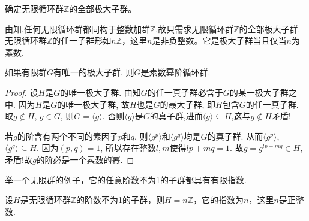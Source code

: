 \documentclass[../../main.tex]{subfiles}%
\begin{document}
\begin{example}
确定无限循环群$\mathbb{Z}$的全部极大子群。
\end{example}
\begin{solution}

由知,任何无限循环群都同构于整数加群$\mathbb{Z}$,故只需求无限循环群$\mathbb{Z}$的全部极大子群.无限循环群$\mathbb{Z}$的任一子群形如$n\mathbb{Z}$，这里$n$是非负整数。它是极大子群当且仅当$n$为素数.

\end{solution}

\begin{proposition}\label{proposition:有限群唯一极大子群则必为素数幂阶循环群}
如果有限群$G$有唯一的极大子群, 则$G$是素数幂阶循环群.
\end{proposition}
\begin{proof}

设$H$是$G$的唯一极大子群. 由知$G$的任一真子群必含于$G$的某一极大子群之中. 因为$H$是$G$的唯一极大子群, 故$H$也是$G$的最大子群, 即$H$包含$G$的任一真子群. 取$g \notin H$, $g \in G$, 则$G = \langle g \rangle$. 否则$\langle g \rangle$是$G$的真子群,进而$\langle g \rangle \subseteq H$,这与$g\notin H$矛盾!

若$g$的阶含有两个不同的素因子$p$和$q$, 则$\langle g^p \rangle$和$\langle g^q \rangle$均是$G$的真子群. 从而$\langle g^p \rangle$, $\langle g^q \rangle \subseteq H$. 因为$(p,q)=1$, 所以存在整数$l,m$使得$lp + mq = 1$. 故$g = g^{lp+mq} \in H$, 矛盾!故$g$的阶必是一个素数的幂.

\end{proof}

\begin{example}
举一个无限群的例子，它的任意阶数不为1的子群都具有有限指数.
\end{example}
\begin{solution}

设$H$是无限循环群$\mathbb{Z}$的阶数不为1的子群，则$H=n\mathbb{Z}$，它的指数为$n$，这里$n$是正整数.

\end{solution}
\end{document}
